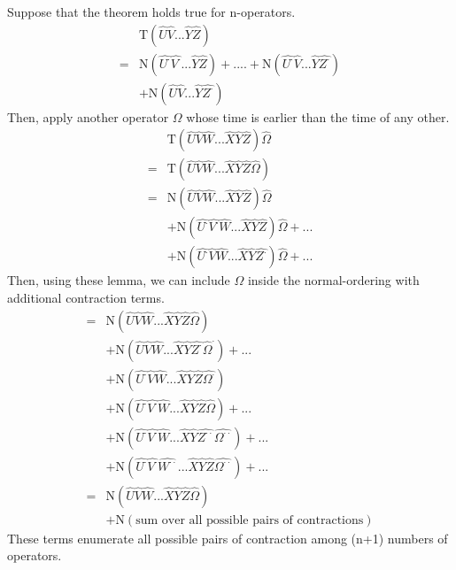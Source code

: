 Suppose that the theorem holds true for n-operators.
\begin{align}
&\mathrm{T}(\hat{U}\hat{V}...\hat{Y}\hat{Z}) \nonumber \\
=&\mathrm{N}(\hat{U^{\cdot}}\hat{V^{\cdot}}...\hat{Y}\hat{Z})+....+\mathrm{N}(\hat{U^{\cdot}}\hat{V}...\hat{Y}\hat{Z^{\cdot}})\nonumber \\
&+\mathrm{N}(\hat{U}\hat{V}...\hat{Y}\hat{Z^{\cdot}})\nonumber
\end{align}
Then, apply another operator $\Omega$ whose time is earlier than the time of any other.
\begin{align}
&\mathrm{T}(\hat{U}\hat{V}\hat{W}...\hat{X}\hat{Y}\hat{Z})\hat{\Omega} \nonumber \\
=&\mathrm{T}(\hat{U}\hat{V}\hat{W}...\hat{X}\hat{Y}\hat{Z}\hat{\Omega}) \nonumber \\
=&\mathrm{N}(\hat{U}\hat{V}\hat{W}...\hat{X}\hat{Y}\hat{Z})\hat{\Omega}\nonumber \\
&+\mathrm{N}(\hat{U^{\cdot}}\hat{V^{\cdot}}\hat{W}...\hat{X}\hat{Y}\hat{Z})\hat{\Omega}+...\nonumber \\
&+\mathrm{N}(\hat{U^{\cdot}}\hat{V}\hat{W}...\hat{X}\hat{Y}\hat{Z^{\cdot}})\hat{\Omega}+...\nonumber
\end{align}
Then, using these lemma, we can include $\Omega$ inside the normal-ordering with additional contraction terms.
\begin{align}
=&\mathrm{N}(\hat{U}\hat{V}\hat{W}...\hat{X}\hat{Y}\hat{Z}\hat{\Omega})\nonumber \\
&+\mathrm{N}(\hat{U}\hat{V}\hat{W}...\hat{X}\hat{Y}\hat{Z^{\cdot}}\hat{\Omega}^{\cdot})+...\nonumber \\
&+\mathrm{N}(\hat{U^{\cdot}}\hat{V}\hat{W}...\hat{X}\hat{Y}\hat{Z}\hat{\Omega^{\cdot}})\nonumber \\
&+\mathrm{N}(\hat{U^{\cdot}}\hat{V^{\cdot}}\hat{W}...\hat{X}\hat{Y}\hat{Z}\hat{\Omega})+...\nonumber \\
&+\mathrm{N}(\hat{U^{\cdot}}\hat{V^{\cdot}}\hat{W}...\hat{X}\hat{Y}\hat{Z^{\cdot\cdot}}\hat{\Omega^{\cdot\cdot}})+...\nonumber \\
&+\mathrm{N}(\hat{U^{\cdot}}\hat{V^{\cdot}}\hat{W^{\cdot\cdot}}...\hat{X}\hat{Y}\hat{Z}\hat{\Omega^{\cdot\cdot}})+...\nonumber \\
=&\mathrm{N}(\hat{U}\hat{V}\hat{W}...\hat{X}\hat{Y}\hat{Z}\hat{\Omega})\nonumber \\
&+\mathrm{N}(\text{sum over all possible pairs of contractions})\nonumber 
\end{align}
These terms enumerate all possible pairs of contraction among (n+1) numbers of operators.

